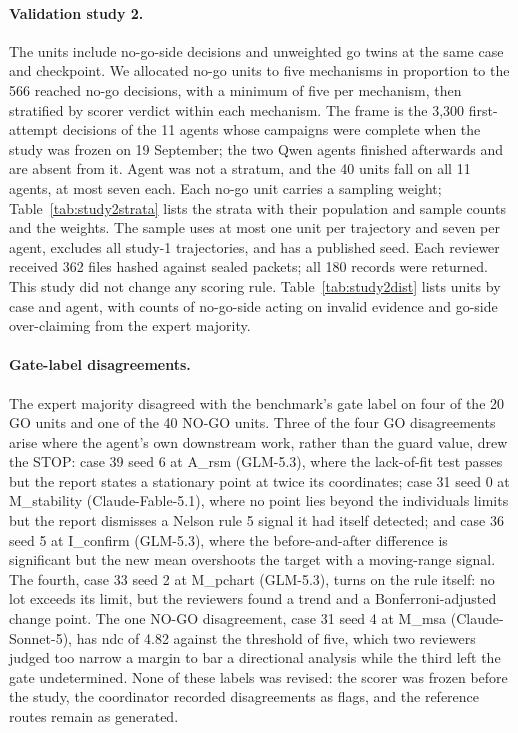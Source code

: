 \documentclass{article}
\begin{document}
\paragraph{Validation study 2.} The \sTwoN{} units include \sTwoStopN{} no-go-side decisions and \sTwoGoN{} unweighted go twins at the same case and checkpoint. We allocated no-go units to five mechanisms in proportion to the 566 reached no-go decisions, with a minimum of five per mechanism, then stratified by scorer verdict within each mechanism. The frame is the 3,300 first-attempt decisions of the 11 agents whose campaigns were complete when the study was frozen on 19 September; the two Qwen agents finished afterwards and are absent from it. Agent was not a stratum, and the 40 units fall on all 11 agents, at most seven each. Each no-go unit carries a sampling weight; Table~\ref{tab:study2strata} lists the strata with their population and sample counts and the weights. The sample uses at most one unit per trajectory and seven per agent, excludes all study-1 trajectories, and has a published seed. Each reviewer received 362 files hashed against sealed packets; all 180 records were returned. This study did not change any scoring rule. Table~\ref{tab:study2dist} lists units by case and agent, with counts of no-go-side acting on invalid evidence and go-side over-claiming from the expert majority.



\paragraph{Gate-label disagreements.} The expert majority disagreed with the benchmark's gate label on four of the 20 GO units and one of the 40 NO-GO units. Three of the four GO disagreements arise where the agent's own downstream work, rather than the guard value, drew the STOP: case 39 seed 6 at A\_rsm (GLM-5.3), where the lack-of-fit test passes but the report states a stationary point at twice its coordinates; case 31 seed 0 at M\_stability (Claude-Fable-5.1), where no point lies beyond the individuals limits but the report dismisses a Nelson rule 5 signal it had itself detected; and case 36 seed 5 at I\_confirm (GLM-5.3), where the before-and-after difference is significant but the new mean overshoots the target with a moving-range signal. The fourth, case 33 seed 2 at M\_pchart (GLM-5.3), turns on the rule itself: no lot exceeds its limit, but the reviewers found a trend and a Bonferroni-adjusted change point. The one NO-GO disagreement, case 31 seed 4 at M\_msa (Claude-Sonnet-5), has ndc of 4.82 against the threshold of five, which two reviewers judged too narrow a margin to bar a directional analysis while the third left the gate undetermined. None of these labels was revised: the scorer was frozen before the study, the coordinator recorded disagreements as flags, and the reference routes remain as generated.
\end{document}
